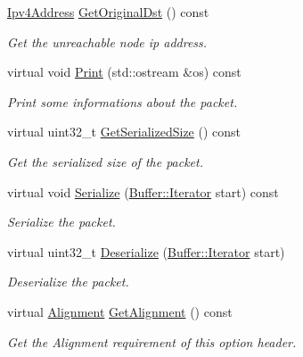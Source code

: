\begin{DoxyCompactItemize}
\hyperlink{classns3_1_1Ipv4Address}{Ipv4\+Address} \hyperlink{classns3_1_1dsr_1_1DsrOptionRerrUnreachHeader_a61c084aa3fcd3cfef8f2637e60f8c1b2}{Get\+Original\+Dst} () const 
\begin{DoxyCompactList}\small\item\em Get the unreachable node ip address. \end{DoxyCompactList}\item 
virtual void \hyperlink{classns3_1_1dsr_1_1DsrOptionRerrUnreachHeader_a76cc23e1d7c5a76a83c0b877c5652b13}{Print} (std\+::ostream \&os) const 
\begin{DoxyCompactList}\small\item\em Print some informations about the packet. \end{DoxyCompactList}\item 
virtual uint32\+\_\+t \hyperlink{classns3_1_1dsr_1_1DsrOptionRerrUnreachHeader_ab74ce423926edec1215fd4372e1071d3}{Get\+Serialized\+Size} () const 
\begin{DoxyCompactList}\small\item\em Get the serialized size of the packet. \end{DoxyCompactList}\item 
virtual void \hyperlink{classns3_1_1dsr_1_1DsrOptionRerrUnreachHeader_aaf3feea2c11c1b363f4d4bc041a8f21c}{Serialize} (\hyperlink{classns3_1_1Buffer_1_1Iterator}{Buffer\+::\+Iterator} start) const 
\begin{DoxyCompactList}\small\item\em Serialize the packet. \end{DoxyCompactList}\item 
virtual uint32\+\_\+t \hyperlink{classns3_1_1dsr_1_1DsrOptionRerrUnreachHeader_ab6cda2c6108b5a5076941b7f541ef320}{Deserialize} (\hyperlink{classns3_1_1Buffer_1_1Iterator}{Buffer\+::\+Iterator} start)
\begin{DoxyCompactList}\small\item\em Deserialize the packet. \end{DoxyCompactList}\item 
virtual \hyperlink{structns3_1_1dsr_1_1DsrOptionHeader_1_1Alignment}{Alignment} \hyperlink{classns3_1_1dsr_1_1DsrOptionRerrUnreachHeader_a8b5fae8a498116333a9a00b831baf504}{Get\+Alignment} () const 
\begin{DoxyCompactList}\small\item\em Get the Alignment requirement of this option header. \end{DoxyCompactList}\end{DoxyCompactItemize}
